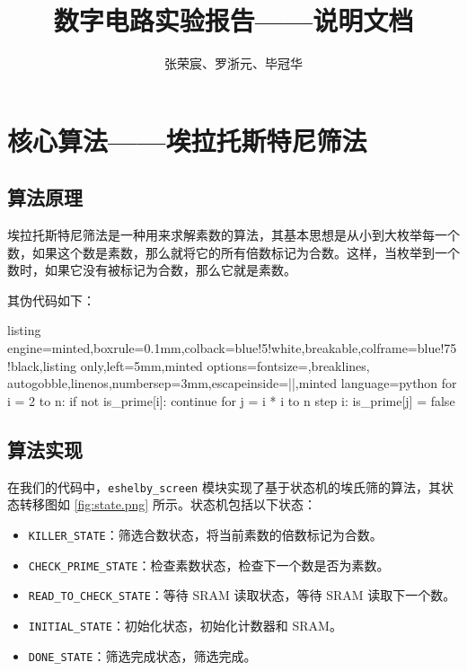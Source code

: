 \documentclass[a4paper]{article}
\begin{document}
\title{数字电路实验报告——说明文档}
\author{张荣宸、罗浙元、毕冠华}
\date{}

\maketitle
\tableofcontents

\section{核心算法——埃拉托斯特尼筛法}
\subsection{算法原理}

埃拉托斯特尼筛法是一种用来求解素数的算法，其基本思想是从小到大枚举每一个数，如果这个数是素数，那么就将它的所有倍数标记为合数。这样，当枚举到一个数时，如果它没有被标记为合数，那么它就是素数。

其伪代码如下：

\begin{tcblisting}{listing engine=minted,boxrule=0.1mm,colback=blue!5!white,breakable,colframe=blue!75!black,listing only,left=5mm,minted options={fontsize=\small,breaklines, autogobble,linenos,numbersep=3mm,escapeinside=||},minted language=python}
for i = 2 to n:
   if not is_prime[i]:
      continue
   for j = i * i to n step i:
      is_prime[j] = false
\end{tcblisting}

\subsection{算法实现}

在我们的代码中，\texttt{eshelby\_screen} 模块实现了基于状态机的埃氏筛的算法，其状态转移图如 \ref{fig:state.png} 所示。状态机包括以下状态：
\begin{itemize}
   \item \texttt{KILLER\_STATE}：筛选合数状态，将当前素数的倍数标记为合数。
   \item \texttt{CHECK\_PRIME\_STATE}：检查素数状态，检查下一个数是否为素数。
   \item \texttt{READ\_TO\_CHECK\_STATE}：等待 SRAM 读取状态，等待 SRAM 读取下一个数。
   \item \texttt{INITIAL\_STATE}：初始化状态，初始化计数器和 SRAM。
   \item \texttt{DONE\_STATE}：筛选完成状态，筛选完成。
\end{itemize}
\end{document}
